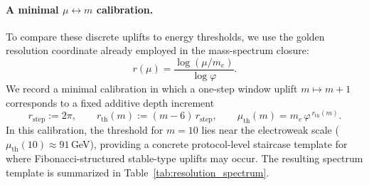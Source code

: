 \paragraph{A minimal \texorpdfstring{$\mu\leftrightarrow m$}{mu<->m} calibration.}
To compare these discrete uplifts to energy thresholds, we use the golden resolution coordinate already employed in the mass-spectrum closure:
\[
r(\mu)=\frac{\log(\mu/m_e)}{\log\varphi}.
\]
We record a minimal calibration in which a one-step window uplift $m\mapsto m+1$ corresponds to a fixed additive depth increment
\[
r_{\mathrm{step}}:=2\pi,
\qquad
r_{\mathrm{th}}(m):=(m-6)\,r_{\mathrm{step}},
\qquad
\mu_{\mathrm{th}}(m)=m_e\,\varphi^{\,r_{\mathrm{th}}(m)}.
\]
In this calibration, the threshold for $m=10$ lies near the electroweak scale ($\mu_{\mathrm{th}}(10)\approx 91\,$GeV), providing a concrete protocol-level staircase template for where Fibonacci-structured stable-type uplifts may occur.
The resulting spectrum template is summarized in Table~\ref{tab:resolution_spectrum}.

